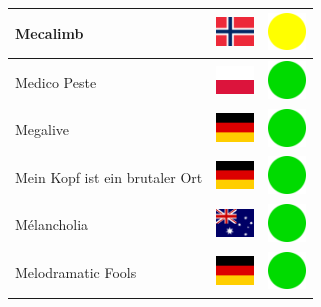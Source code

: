 \documentclass[12pt, a4paper, twoside]{report}
\begin{document}
\begin{center}
\begin{longtable}{|p{5cm}|p{2cm}|p{2cm}|}
 Mecalimb                                                   & \includegraphics[width=1cm]{../4x3/no} &   \includegraphics[width=1cm]{../likes/m} \\ \hline
 Medico Peste                                               & \includegraphics[width=1cm]{../4x3/pl} &   \includegraphics[width=1cm]{../likes/y} \\ \hline
 Megalive                                                   & \includegraphics[width=1cm]{../4x3/de} &   \includegraphics[width=1cm]{../likes/y} \\ \hline
 Mein Kopf ist ein brutaler Ort                             & \includegraphics[width=1cm]{../4x3/de} &   \includegraphics[width=1cm]{../likes/y} \\ \hline
 Mélancholia                                                & \includegraphics[width=1cm]{../4x3/au} &   \includegraphics[width=1cm]{../likes/y} \\ \hline
 Melodramatic Fools                                         & \includegraphics[width=1cm]{../4x3/de} &   \includegraphics[width=1cm]{../likes/y} \\ \hline

\end{longtable}
\end{center}
\end{document}
